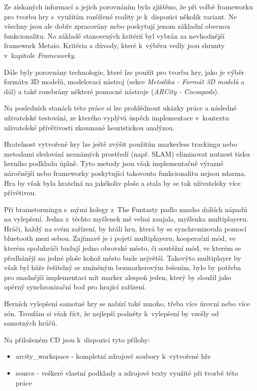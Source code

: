 \documentclass[twoside,12pt]{article}
\begin{document}
Ze získaných informací a jejich porovnáním bylo zjišťěno, že při volbě frameworku pro tvorbu hry s~využitím rozšířené reality je k~dispozici několik variant. Ne všechny jsou ale dobře zpracovány nebo poskytují jenom základní obecnou funkcionalitu. Na základě stanovených kritérií byl vybrán za nevhodnější framework Metaio. Kritéria a důvody, které k~výběru vedly jsou shrnuty v~kapitole \textit{Frameworky}. 

Dále byly porovnány technologie, které lze použít pro tvorbu hry, jako je výběr formátu 3D modelů, modelovací nástroj (sekce \textit{Metodika - Formát 3D modelů} a dál) a také rozebrány některé pomocné nástroje (\textit{ARCity - Cocoapods}).

Na posledních stanách této práce si lze prohlédnout ukázky práce a následné uživatelské testování, ze kterého vyplývá úspěch implementace v~kontextu uživatelské přívětivosti zkoumané heuristickou analýzou. 

%
Hratelnost vytvořené hry lze ještě zvýšit použitím markerless trackingu nebo metodami sledování neznámých prostředí (např. SLAM) eliminovat nutnost tisku herního podkladu úplně. Tyto metody jsou však implementačně výrazně náročnější nebo frameworky poskytující takovouto funkcionalitu nejsou zdarma. Hra by však byla hratelná na jakékoliv ploše a stala by se tak uživatelsky více přívětivou.

Při brainstormingu s~mými kolegy z~The Funtasty padlo mnoho dalších nápadů na vylepšení. Jedna z~těchto myšlenek mě velmi zaujala, myšlenka multiplayeru. Hráči, každý na svém zařízení, by hráli hru, která by se synchronizovala pomocí bluetooth mezi sebou. Zajímavé je i pojetí multiplayeru, kooperační mód, ve kterém spoluhráči budují jedno obrovské město, či soutěžní mód, ve kterém se předhánějí na jedné ploše kohož město bude největší. Takovýto multiplayer by však byl hůře řešitelný se zmíněným bezmarkerovým řešením, bylo by potřeba pro snadnější implementaci mít marker alespoň jeden, který by sloužil jako opěrný synchronizační bod pro hrající zařízení. 

Herních vylepšení samotné hry se nabízí také mnoho, třeba více úrovní nebo více zón. Troufám si však říct, že nejlepší podněty k~vylepšení by vzešly od samotných hráčů. 

%
%
Na přiloženém CD jsou k~dispozici tyto přílohy: 
\begin{itemize}
\item arcity\_workspace - kompletní zdrojové soubory k~vytvořené hře
\item source - veškeré vlastní podklady a zdrojové texty využité při tvorbě této práce
\end{itemize}
\end{document}
